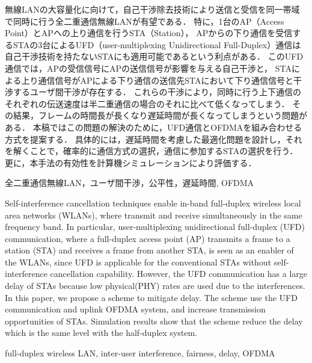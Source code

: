 \documentclass[technicalreport]{ieicej}
\begin{document}
\begin{jabstract}
	無線LANの大容量化に向けて，自己干渉除去技術により送信と受信を同一帯域で同時に行う全二重通信無線LANが有望である．
	特に，1台のAP（Access Point）とAPへの上り通信を行うSTA（Station），
	APからの下り通信を受信するSTAの3台によるUFD（user-multiplexing Unidirectional Full-Duplex）通信は自己干渉技術を持たないSTAにも適用可能であるという利点がある．
	このUFD通信では，APの受信信号にAPの送信信号が影響を与える自己干渉と，
	STAによる上り通信信号がAPによる下り通信の送信先STAにおいて下り通信信号と干渉するユーザ間干渉が存在する．
	これらの干渉により，同時に行う上下通信のそれぞれの伝送速度は半二重通信の場合のそれに比べて低くなってしまう．
	その結果，フレームの時間長が長くなり遅延時間が長くなってしまうという問題がある．
	本稿ではこの問題の解決のために，UFD通信とOFDMAを組み合わせる方式を提案する．
	具体的には，遅延時間を考慮した最適化問題を設計し，それを解くことで，確率的に通信方式の選択，通信に参加するSTAの選択を行う．
	更に，本手法の有効性を計算機シミュレーションにより評価する．
\end{jabstract}
\begin{jkeyword}
	全二重通信無線LAN，ユーザ間干渉，公平性，遅延時間, OFDMA
\end{jkeyword}
\begin{eabstract}
	Self-interference cancellation techniques enable in-band full-duplex wireless local area networks (WLANs), where transmit and receive simultaneously in the same frequency band.
	In particular, user-multiplexing unidirectional full-duplex (UFD) communication, where a full-duplex access point (AP) transmits a frame to a station (STA) and receives a frame from another STA, is seen as an enabler of the WLANs, since UFD is applicable for the conventional STAs without self-interference cancellation capability.
	However, the UFD communication has a large delay of STAs because low physical(PHY) rates are used due to the interferences.
	In this paper, we propose a scheme to mitigate delay.
	The scheme use the UFD communication and uplink OFDMA system, and increase transmission opportunities of STAs.
	Simulation results show that the scheme reduce the delay which is the same level with the half-duplex system.

\end{eabstract}
\begin{ekeyword}
	full-duplex wireless LAN, inter-user interference, fairness, delay, OFDMA
\end{ekeyword}

\end{document}
